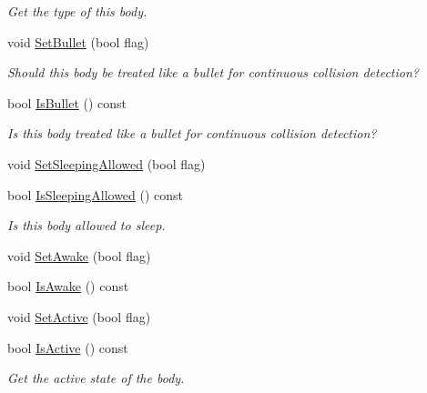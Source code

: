\begin{DoxyCompactItemize}
\begin{DoxyCompactList}\small\item\em Get the type of this body. \end{DoxyCompactList}\item 
\mbox{\label{classb2Body_a3253af3725b8d6d63d8223bcd2ddab5c}} 
void \hyperlink{classb2Body_a3253af3725b8d6d63d8223bcd2ddab5c}{Set\+Bullet} (bool flag)
\begin{DoxyCompactList}\small\item\em Should this body be treated like a bullet for continuous collision detection? \end{DoxyCompactList}\item 
\mbox{\label{classb2Body_ad99db1c7a19e8de333ff7f65b0b953f4}} 
bool \hyperlink{classb2Body_ad99db1c7a19e8de333ff7f65b0b953f4}{Is\+Bullet} () const
\begin{DoxyCompactList}\small\item\em Is this body treated like a bullet for continuous collision detection? \end{DoxyCompactList}\item 
void \hyperlink{classb2Body_a229a6de228416203fecbf7a7544c33bb}{Set\+Sleeping\+Allowed} (bool flag)
\item 
\mbox{\label{classb2Body_ac47251de3a8c0ccff620be7bd5ae696a}} 
bool \hyperlink{classb2Body_ac47251de3a8c0ccff620be7bd5ae696a}{Is\+Sleeping\+Allowed} () const
\begin{DoxyCompactList}\small\item\em Is this body allowed to sleep. \end{DoxyCompactList}\item 
void \hyperlink{classb2Body_ac72ed3df52a26c33db82252ab57399af}{Set\+Awake} (bool flag)
\item 
bool \hyperlink{classb2Body_a697f708427cdf7d31a626e80e694682c}{Is\+Awake} () const
\item 
void \hyperlink{classb2Body_ab8059b7b3e3b64aee17b54f68f7dde80}{Set\+Active} (bool flag)
\item 
\mbox{\label{classb2Body_a825f37f457d3674ace96e2b8a9b4cae6}} 
bool \hyperlink{classb2Body_a825f37f457d3674ace96e2b8a9b4cae6}{Is\+Active} () const
\begin{DoxyCompactList}\small\item\em Get the active state of the body. \end{DoxyCompactList}\item 

\end{DoxyCompactItemize}
